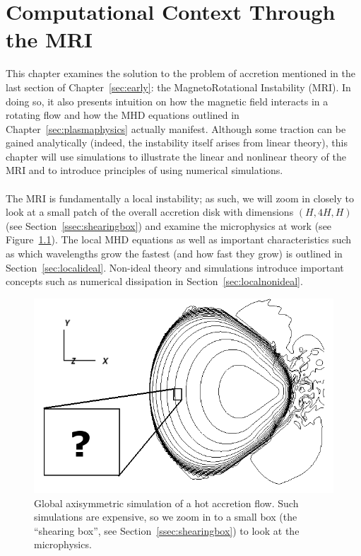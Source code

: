 \chapter{Computational Context Through the MRI} \label{chap:compMRI}
This chapter examines the solution to the problem of accretion mentioned in the last section of Chapter~\ref{sec:early}: the MagnetoRotational Instability (MRI). In doing so, it also presents intuition on how the magnetic field interacts in a rotating flow and how the MHD equations outlined in Chapter~\ref{sec:plasmaphysics} actually manifest. Although some traction can be gained analytically (indeed, the instability itself arises from linear theory), this chapter will use simulations to illustrate the linear and nonlinear theory of the MRI and to introduce principles of using numerical simulations. \\
\\
The MRI is fundamentally a local instability; as such, we will zoom in closely to look at a small patch of the overall accretion disk with dimensions $(H,4H,H)$ (see Section~\ref{ssec:shearingbox}) and examine the microphysics at work (see Figure~\ref{fig:global}). The local MHD equations as well as important characteristics such as which wavelengths grow the fastest (and how fast they grow) is outlined in Section~\ref{sec:localideal}. Non-ideal theory and simulations introduce important concepts such as numerical dissipation in Section~\ref{sec:localnonideal}. 
\begin{figure}[h]
  \begin{center}  
    \includegraphics[width=.9\textwidth, angle=0.]{img/global.png}
  \end{center}
  \caption{Global axisymmetric simulation of a hot accretion flow. Such simulations are expensive, so we zoom in to a small box (the ``shearing box'', see Section~\ref{ssec:shearingbox}) to look at the microphysics.}
  \label{fig:global}
\end{figure}

